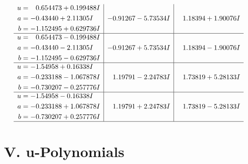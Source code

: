 \documentclass[1p]{elsarticle_modified}
\theoremstyle{definition}
\begin{document}
$$\begin{array}{c|c|c}
\begin{aligned}
u &= \phantom{-}0.654473 + 0.199488 I \\
a &= -0.43440 + 2.11305 I \\
b &= -1.152495 + 0.629736 I\end{aligned}
 & -0.91267 - 5.73534 I & \phantom{-}1.18394 + 1.90076 I \\ \hline\begin{aligned}
u &= \phantom{-}0.654473 - 0.199488 I \\
a &= -0.43440 - 2.11305 I \\
b &= -1.152495 - 0.629736 I\end{aligned}
 & -0.91267 + 5.73534 I & \phantom{-}1.18394 - 1.90076 I \\ \hline\begin{aligned}
u &= -1.54958 + 0.16338 I \\
a &= -0.233188 - 1.067878 I \\
b &= -0.730207 - 0.257776 I\end{aligned}
 & \phantom{-}1.19791 - 2.24783 I & \phantom{-}1.73819 + 5.28133 I \\ \hline\begin{aligned}
u &= -1.54958 - 0.16338 I \\
a &= -0.233188 + 1.067878 I \\
b &= -0.730207 + 0.257776 I\end{aligned}
 & \phantom{-}1.19791 + 2.24783 I & \phantom{-}1.73819 - 5.28133 I\\
 \hline 
 \end{array}$$\newpage
\newpage\renewcommand{\arraystretch}{1}
\centering \section*{ V. u-Polynomials}
\end{document}
